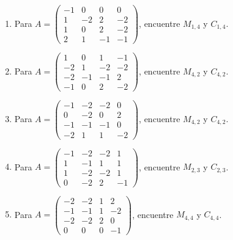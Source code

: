 \documentclass[12pt]{article}
\theoremstyle{remark}
\newcounter{contadorEjercicio}
\newenvironment{listaejercicios}{\begin{enumerate}[label=\textbf{E\arabic*.},leftmargin=2.4em,itemsep=0.52em]\setcounter{enumi}{\value{contadorEjercicio}}}{\setcounter{contadorEjercicio}{\value{enumi}}\end{enumerate}}
\begin{document}
\begin{listaejercicios}
\item Para $A=\begin{pmatrix}-1&0&0&0\\1&-2&2&-2\\1&0&2&-2\\2&1&-1&-1\end{pmatrix}$, encuentre $M_{1,4}$ y $C_{1,4}$.

\item Para $A=\begin{pmatrix}1&0&1&-1\\-2&1&-2&-2\\-2&-1&-1&2\\-1&0&2&-2\end{pmatrix}$, encuentre $M_{4,2}$ y $C_{4,2}$.

\item Para $A=\begin{pmatrix}-1&-2&-2&0\\0&-2&0&2\\-1&-1&-1&0\\-2&1&1&-2\end{pmatrix}$, encuentre $M_{4,2}$ y $C_{4,2}$.

\item Para $A=\begin{pmatrix}-1&-2&-2&1\\1&-1&1&1\\1&-2&-2&1\\0&-2&2&-1\end{pmatrix}$, encuentre $M_{2,3}$ y $C_{2,3}$.

\item Para $A=\begin{pmatrix}-2&-2&1&2\\-1&-1&1&-2\\-2&-2&2&0\\0&0&0&-1\end{pmatrix}$, encuentre $M_{4,4}$ y $C_{4,4}$.

\end{listaejercicios}
\end{document}
